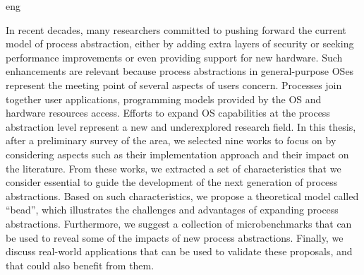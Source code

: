 \begin{resumo}{eng}

In recent decades, many researchers committed to pushing forward the current
model of process abstraction, either by adding extra layers of security or
seeking performance improvements or even providing support for new hardware.
Such enhancements are relevant because process abstractions in general-purpose
OSes represent the meeting point of several aspects of users concern. Processes
join together user applications, programming models provided by the OS and
hardware resources access. Efforts to expand OS capabilities at the process
abstraction level represent a new and underexplored research field. In this
thesis, after a preliminary survey of the area, we selected nine works to focus
on by considering aspects such as their implementation approach and their
impact on the literature. From these works, we extracted a set of
characteristics that we consider essential to guide the development of the next
generation of process abstractions. Based on such characteristics, we propose a
theoretical model called ``bead'', which illustrates the challenges and
advantages of expanding process abstractions. Furthermore, we suggest a
collection of microbenchmarks that can be used to reveal some of the impacts of
new process abstractions. Finally, we discuss real-world applications that can
be used to validate these proposals, and that could also benefit from them. 

\end{resumo}

\makeatletter
\if@openright\cleardoublepage\else\clearpage\fi
\makeatother



